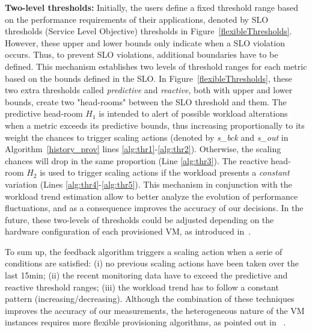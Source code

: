 \textbf{Two-level thresholds:} Initially, the users define a fixed threshold range based on the performance requirements of their applications, denoted by SLO thresholds (Service Level Objective) thresholds in Figure~\ref{flexibleThresholds}. However, these upper and lower bounds only indicate when a SLO violation occurs. Thus, to prevent SLO violations, additional boundaries have to be defined. This mechanism establishes two levels of threshold ranges for each metric based on the bounds defined in the SLO. In Figure~\ref{flexibleThresholds}, these two extra thresholds called \emph{predictive} and \emph{reactive}, both with upper and lower bounds, create two "head-rooms" between the SLO threshold and them. The predictive head-room $H_1$ is intended to alert of possible workload alterations when a metric exceeds its predictive bounds, thus increasing proportionally to its weight the chances to trigger scaling actions (denoted by \emph{s\_bck} and \emph{s\_out}  in Algorithm~\ref{history_prov} lines \ref{alg:thr1}-\ref{alg:thr2}). Otherwise, the scaling chances will drop in the same proportion (Line \ref{alg:thr3}). The reactive head-room $H_2$ is used to trigger scaling actions if the workload presents a \emph{constant} variation (Lines \ref{alg:thr4}-\ref{alg:thr5}). This mechanism in conjunction with the workload trend estimation allow to better analyze the evolution of performance fluctuations, and as a consequence improves the accuracy of our decisions. In the future, these two-levels of thresholds could be adjusted depending on the hardware configuration of each provisioned VM, as introduced in~\cite{beloglazov_adaptive_2010}.  

To sum up, the feedback algorithm triggers a scaling action when a serie of conditions are satisfied: (i) no previous scaling actions have been taken over the last 15min; (ii) the recent monitoring data have to exceed the predictive and reactive threshold ranges; (iii) the workload trend has to follow a constant pattern (increasing/decreasing). Although the combination of these techniques improves the accuracy of our measurements, the heterogeneous nature of the VM instances requires more flexible provisioning algorithms, as pointed out in ~\cite{jiangThesis}. 


